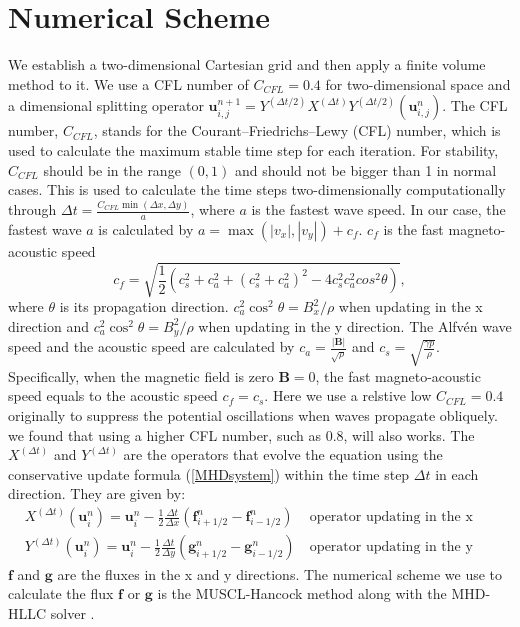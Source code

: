 \section{Numerical Scheme}
\label{section 3.1}
We establish a two-dimensional Cartesian grid and then apply a finite volume method to it. We use a CFL number of $C_{CFL}=0.4$ for two-dimensional space and a dimensional splitting operator $\mathbf{u}_{i,j}^{n+1}={{Y}^{\left( \Delta t/2 \right)}}{{X}^{(\Delta t)}}{{Y}^{\left( \Delta t/2 \right)}}\left( \mathbf{u}_{i,j}^{n} \right)$. The CFL number, $C_{CFL}$, stands for the Courant–Friedrichs–Lewy (CFL) number, which is used to calculate the maximum stable time step for each iteration. For stability, $C_{CFL}$ should be in the range $(0, 1)$ and should not be bigger than 1 in normal cases. This is used to calculate the time steps two-dimensionally computationally through $\Delta t=\frac{C_{CFL} \min(\Delta x, \Delta y)}{a}$, where $a$ is the fastest wave speed. In our case, the fastest wave $a$ is calculated by $a=\max(|v_x|,|v_y|)+c_f$. $c_f$ is the fast magneto-acoustic speed
$$c_f=\sqrt{\frac{1}{2}(c_s^2+c_a^2+(c_s^2+c_a^2)^2-4c_s^2c_a^2cos^2\theta)},$$ where $\theta$ is its propagation direction. $c_a^2 \cos^2 \theta = B_x^2 / \rho$ when updating in the x direction and $c_a^2 \cos^2 \theta = B_y^2 / \rho$ when updating in the y direction. The Alfvén wave speed and the acoustic speed are calculated by $c_a = \frac{|\mathbf{B}|}{\sqrt{\rho}}$ and $c_s = \sqrt{\frac{\gamma p}{\rho}}$. Specifically, when the magnetic field is zero $\mathbf{B}=0$, the fast magneto-acoustic speed equals to the acoustic speed $c_f = c_s$. Here we use a relstive low $C_{CFL}=0.4$ originally to suppress the potential oscillations when waves propagate obliquely. we found that using a higher CFL number, such as 0.8, will also works. The ${X}^{(\Delta t)}$ and ${Y}^{(\Delta t)}$ are the operators that evolve the equation using the conservative update formula (\ref{MHDsystem}) within the time step $\Delta t$ in each direction. They are given by:
\begin{align*}
&{X}^{(\Delta t)}(\mathbf{u}^{n}_{i}) = \mathbf{u}^{n}_{i} - \frac{1}{2} \frac{\Delta t}{\Delta x} \left( \mathbf{f}_{i+1/2}^{n} - \mathbf{f}^{n}_{i-1/2} \right)\ &\text{operator updating in the x direction,}\\
&{Y}^{(\Delta t)}(\mathbf{u}^{n}_{i})= \mathbf{u}^{n}_{i} - \frac{1}{2} \frac{\Delta t}{\Delta y} \left( \mathbf{g}_{i+1/2}^{n} - \mathbf{g}^{n}_{i-1/2} \right)\ &\text{operator updating in the y direction.}
\end{align*}
$\mathbf{f}$ and $\mathbf{g}$ are the fluxes in the x and y directions. The numerical scheme we use to calculate the flux $\mathbf{f}$ or $\mathbf{g}$ is the MUSCL-Hancock method \cite{toro2013riemann} along with the MHD-HLLC solver \cite{li2005hllc}.
